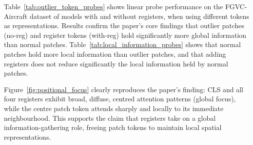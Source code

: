 Table~\ref{tab:outlier_token_probes} shows linear probe performance on the FGVC-Aircraft dataset of models with and without registers, when using different tokens as representations. Results confirm the paper's core findings that  outlier patches (no-reg) and register tokens (with-reg) hold significantly more global information than normal patches.
Table~\ref{tab:local_information_probes} shows that normal patches hold more local information than outlier patches, and that adding registers does not reduce significantly the local information held by normal patches.

Figure~\ref{fig:positional_focus} clearly reproduces the paper's finding: CLS and all four registers exhibit broad, diffuse, centred attention patterns (global focus), while the centre patch token attends sharply and locally to its immediate neighbourhood. This supports the claim that registers take on a global information-gathering role, freeing patch tokens to maintain local spatial representations.